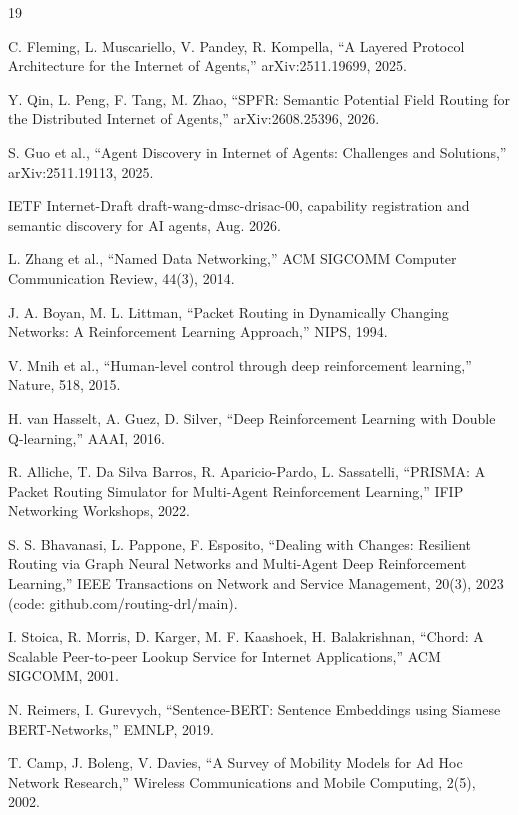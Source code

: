 \documentclass[journal]{IEEEtran}
\begin{document}
\begin{thebibliography}{19}

C. Fleming, L. Muscariello, V. Pandey, R. Kompella, ``A Layered Protocol Architecture for the Internet of Agents,'' arXiv:2511.19699, 2025.

Y. Qin, L. Peng, F. Tang, M. Zhao, ``SPFR: Semantic Potential Field Routing for the Distributed Internet of Agents,'' arXiv:2608.25396, 2026.

S. Guo et al., ``Agent Discovery in Internet of Agents: Challenges and Solutions,'' arXiv:2511.19113, 2025.

IETF Internet-Draft draft-wang-dmsc-drisac-00, capability registration and semantic discovery for AI agents, Aug. 2026.

L. Zhang et al., ``Named Data Networking,'' ACM SIGCOMM Computer Communication Review, 44(3), 2014.

J. A. Boyan, M. L. Littman, ``Packet Routing in Dynamically Changing Networks: A Reinforcement Learning Approach,'' NIPS, 1994.

V. Mnih et al., ``Human-level control through deep reinforcement learning,'' Nature, 518, 2015.

H. van Hasselt, A. Guez, D. Silver, ``Deep Reinforcement Learning with Double Q-learning,'' AAAI, 2016.

R. Alliche, T. Da Silva Barros, R. Aparicio-Pardo, L. Sassatelli, ``PRISMA: A Packet Routing Simulator for Multi-Agent Reinforcement Learning,'' IFIP Networking Workshops, 2022.

S. S. Bhavanasi, L. Pappone, F. Esposito, ``Dealing with Changes: Resilient Routing via Graph Neural Networks and Multi-Agent Deep Reinforcement Learning,'' IEEE Transactions on Network and Service Management, 20(3), 2023 (code: github.com/routing-drl/main).

I. Stoica, R. Morris, D. Karger, M. F. Kaashoek, H. Balakrishnan, ``Chord: A Scalable Peer-to-peer Lookup Service for Internet Applications,'' ACM SIGCOMM, 2001.

N. Reimers, I. Gurevych, ``Sentence-BERT: Sentence Embeddings using Siamese BERT-Networks,'' EMNLP, 2019.

T. Camp, J. Boleng, V. Davies, ``A Survey of Mobility Models for Ad Hoc Network Research,'' Wireless Communications and Mobile Computing, 2(5), 2002.


\end{thebibliography}
\end{document}
